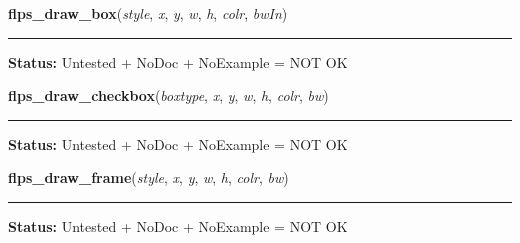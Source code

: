     \label{xformslib:library:flps_draw_box}

    \vspace{0.5ex}

\hspace{.8\funcindent}\begin{boxedminipage}{\funcwidth}

    \raggedright \textbf{flps\_draw\_box}(\textit{style}, \textit{x}, \textit{y}, \textit{w}, \textit{h}, \textit{colr}, \textit{bwIn})

    \vspace{-1.5ex}

    \rule{\textwidth}{0.5\fboxrule}
\setlength{\parskip}{2ex}
\setlength{\parskip}{1ex}
\textbf{Status:} Untested + NoDoc + NoExample = NOT OK



    \end{boxedminipage}

    \label{xformslib:library:flps_draw_checkbox}

    \vspace{0.5ex}

\hspace{.8\funcindent}\begin{boxedminipage}{\funcwidth}

    \raggedright \textbf{flps\_draw\_checkbox}(\textit{boxtype}, \textit{x}, \textit{y}, \textit{w}, \textit{h}, \textit{colr}, \textit{bw})

    \vspace{-1.5ex}

    \rule{\textwidth}{0.5\fboxrule}
\setlength{\parskip}{2ex}
\setlength{\parskip}{1ex}
\textbf{Status:} Untested + NoDoc + NoExample = NOT OK



    \end{boxedminipage}

    \label{xformslib:library:flps_draw_frame}

    \vspace{0.5ex}

\hspace{.8\funcindent}\begin{boxedminipage}{\funcwidth}

    \raggedright \textbf{flps\_draw\_frame}(\textit{style}, \textit{x}, \textit{y}, \textit{w}, \textit{h}, \textit{colr}, \textit{bw})

    \vspace{-1.5ex}

    \rule{\textwidth}{0.5\fboxrule}
\setlength{\parskip}{2ex}
\setlength{\parskip}{1ex}
\textbf{Status:} Untested + NoDoc + NoExample = NOT OK



    \end{boxedminipage}

